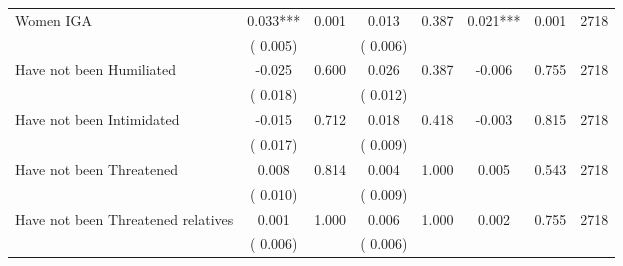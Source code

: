 \begin{tabular}{l*{7}{c}}
 Women IGA       &              0.033***       &        0.001  &              0.013       &        0.387  &              0.021***       &              0.001 &  2718 \\ 
                       &       (       0.005)             &                               &       (       0.006)                     &                               &                                               &                                &                      \\ 

 Have not been Humiliated       &             -0.025       &        0.600  &              0.026       &        0.387  &             -0.006       &              0.755 &  2718 \\ 
                       &       (       0.018)             &                               &       (       0.012)                     &                               &                                               &                                &                      \\ 

 Have not been Intimidated       &             -0.015       &        0.712  &              0.018       &        0.418  &             -0.003       &              0.815 &  2718 \\ 
                       &       (       0.017)             &                               &       (       0.009)                     &                               &                                               &                                &                      \\ 

 Have not been Threatened       &              0.008       &        0.814  &              0.004       &        1.000  &              0.005       &              0.543 &  2718 \\ 
                       &       (       0.010)             &                               &       (       0.009)                     &                               &                                               &                                &                      \\ 

 Have not been Threatened relatives       &              0.001       &        1.000  &              0.006       &        1.000  &              0.002       &              0.755 &  2718 \\ 
                       &       (       0.006)             &                               &       (       0.006)                     &                               &                                               &                                &                      \\ 


\end{tabular}
